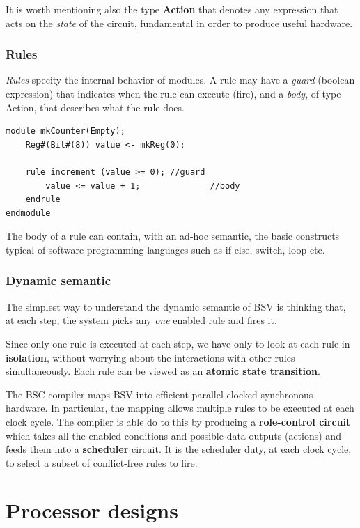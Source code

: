 \documentclass[12pt,oneside,a4paper]{article}
\begin{document}
It is worth mentioning also the type \textbf{Action} that denotes any expression that acts on the \textit{state} of the circuit, fundamental in order to produce useful hardware.
\subsubsection{Rules}
\textit{Rules} specity the internal behavior of modules. A rule may have a \textit{guard} (boolean expression) that indicates when the rule can execute (fire), and a \textit{body}, of type Action, that describes what the rule does.
\begin{lstlisting}[label={bsv:paramtype},caption={Autoincrementing couter with a single rule}]
module mkCounter(Empty);
	Reg#(Bit#(8)) value <- mkReg(0);
	
	rule increment (value >= 0); //guard
		value <= value + 1;			 	 //body
	endrule
endmodule
\end{lstlisting}

The body of a rule can contain, with an ad-hoc semantic, the basic constructs typical of software programming languages such as if-else, switch, loop etc.

\subsubsection{Dynamic semantic}

The simplest way to understand the dynamic semantic of BSV is thinking that, at each step, the system picks any \textit{one} enabled rule and fires it.

Since only one rule is executed at each step, we have only to look at each rule in \textbf{isolation}, without worrying about the interactions with other rules simultaneously. Each rule can be viewed as an \textbf{atomic state transition}.

The BSC compiler maps BSV into efficient parallel clocked synchronous hardware. In particular, the mapping allows multiple rules to be executed at each clock cycle. The compiler is able do to this by producing a \textbf{role-control circuit} which takes all the enabled conditions and possible data outputs (actions) and feeds them into a \textbf{scheduler} circuit. It is the scheduler duty, at each clock cycle, to select a subset of conflict-free rules to fire.

\section{Processor designs}
\newpage
\printbibliography
\end{document}
